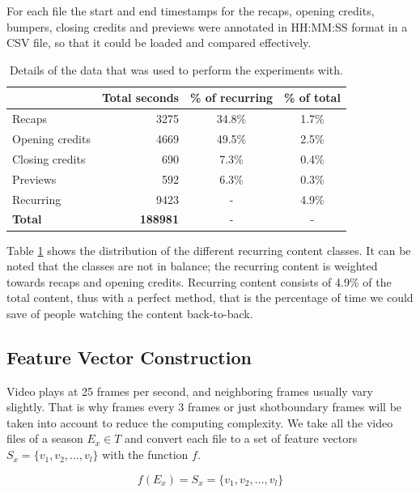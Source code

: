 \documentclass{article}
\begin{document}
For each file the start and end timestamps for the recaps, opening credits, bumpers, closing credits and previews were annotated in HH:MM:SS format in a CSV file, so that it could be loaded and compared effectively.

\begin{table}[h]
	\begin{adjustwidth}{-.5in}{-.5in}  
		\begin{center}
			\begin{tabular}{ l | r c c}
								& Total seconds & \% of recurring 	& \% of total \\
				\hline
				Recaps 			& 3275 			& 34.8\% 			& 1.7\% \\
				Opening credits	& 4669			& 49.5\%			& 2.5\%	\\
				Closing credits	& 690			& 7.3\%				& 0.4\%	\\
				Previews		& 592			& 6.3\%				& 0.3\% \\
				\hline
				Recurring		& 9423			& -					& 4.9\% \\
				\textbf{Total}	& \textbf{188981}		& -					& -
			\end{tabular}
		\end{center}
	\end{adjustwidth}
	\caption{Details of the data that was used to perform the experiments with.}
	\label{table:datastatistics}
\end{table}

Table \ref{table:datastatistics} shows the distribution of the different recurring content classes. It can be noted that the classes are not in balance; the recurring content is weighted towards recaps and opening credits. Recurring content consists of 4.9\% of the total content, thus with a perfect method, that is the percentage of time we could save of people watching the content back-to-back.

\subsection{Feature Vector Construction}
Video plays at 25 frames per second, and neighboring frames usually vary slightly. That is why frames every 3 frames or just shotboundary frames will be taken into account to reduce the computing complexity. We take all the video files of a season $E_x \in T$ and convert each file to a set of feature vectors $S_x = \{v_1, v_2, \dots, v_l\}$ with the function $f$.

\[f(E_x) = S_x = \{v_1, v_2, \dots, v_l\}\]
\end{document}
